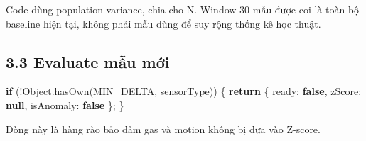 \documentclass[11pt,oneside,openany]{book}
\newenvironment{Shaded}{\begin{snugshade}}{\end{snugshade}}
\newcommand{\BuiltInTok}[1]{\textcolor[rgb]{0.50,0.55,0.55}{#1}}
\newcommand{\ControlFlowTok}[1]{\textcolor[rgb]{0.99,0.74,0.29}{\textbf{#1}}}
\newcommand{\DataTypeTok}[1]{\textcolor[rgb]{0.16,0.50,0.73}{#1}}
\newcommand{\FunctionTok}[1]{\textcolor[rgb]{0.56,0.27,0.68}{#1}}
\newcommand{\KeywordTok}[1]{\textcolor[rgb]{0.81,0.81,0.76}{\textbf{#1}}}
\newcommand{\NormalTok}[1]{\textcolor[rgb]{0.81,0.81,0.76}{#1}}
\newcommand{\OperatorTok}[1]{\textcolor[rgb]{0.81,0.81,0.76}{#1}}
\renewenvironment{Shaded}{%
  \def\FrameCommand{\fboxsep=8pt\colorbox{shadecolor}}%
  \MakeFramed{\advance\hsize-\width\FrameRestore}%
}{\endMakeFramed}
\begin{document}
Code dùng population variance, chia cho N. Window 30 mẫu được coi là
toàn bộ baseline hiện tại, không phải mẫu dùng để suy rộng thống kê học
thuật.

\subsection{3.3 Evaluate mẫu mới}\label{33-evaluate-mux1eabu-mux1edbi}

\begin{Shaded}
\begin{Highlighting}[]
\ControlFlowTok{if}\NormalTok{ (}\OperatorTok{!}\BuiltInTok{Object}\OperatorTok{.}\FunctionTok{hasOwn}\NormalTok{(MIN\_DELTA}\OperatorTok{,}\NormalTok{ sensorType)) \{}
  \ControlFlowTok{return}\NormalTok{ \{ }\DataTypeTok{ready}\OperatorTok{:} \KeywordTok{false}\OperatorTok{,} \DataTypeTok{zScore}\OperatorTok{:} \KeywordTok{null}\OperatorTok{,} \DataTypeTok{isAnomaly}\OperatorTok{:} \KeywordTok{false}\NormalTok{ \}}\OperatorTok{;}
\NormalTok{\}}
\end{Highlighting}
\end{Shaded}

Dòng này là hàng rào bảo đảm gas và motion không bị đưa vào Z-score.
\end{document}
